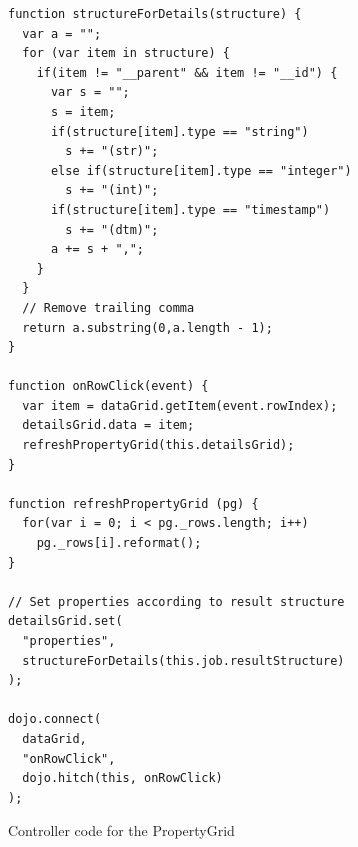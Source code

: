 \begin{listing}[H]
\begin{verbatim}
function structureForDetails(structure) {
  var a = "";
  for (var item in structure) {
    if(item != "__parent" && item != "__id") {
      var s = "";
      s = item;
      if(structure[item].type == "string")
        s += "(str)";
      else if(structure[item].type == "integer")
        s += "(int)";
      if(structure[item].type == "timestamp")
        s += "(dtm)";
      a += s + ",";
    }
  }
  // Remove trailing comma
  return a.substring(0,a.length - 1);
}

function onRowClick(event) {
  var item = dataGrid.getItem(event.rowIndex);
  detailsGrid.data = item;
  refreshPropertyGrid(this.detailsGrid);
}

function refreshPropertyGrid (pg) {
  for(var i = 0; i < pg._rows.length; i++)
    pg._rows[i].reformat();
}

// Set properties according to result structure
detailsGrid.set(
  "properties",
  structureForDetails(this.job.resultStructure)
);

dojo.connect(
  dataGrid,
  "onRowClick",
  dojo.hitch(this, onRowClick)
);
\end{verbatim}
\caption{Controller code for the PropertyGrid}
\label{lst:pgcontroller}
\end{listing}
